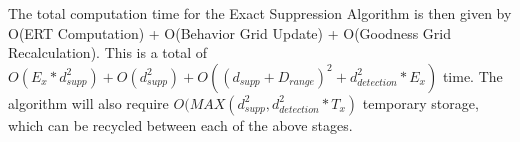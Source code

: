 The total computation time for the Exact Suppression Algorithm is then given by O(ERT Computation) + O(Behavior Grid Update) + O(Goodness Grid Recalculation). This is a total of $O(E_{x} * d_{supp}^2) + O(d_{supp}^2) + O((d_{supp} + D_{range})^2 + d_{detection}^2 * E_x)$ time.  The algorithm will also require $O(MAX(d_{supp}^2 , d_{detection}^2 * T_x)$ temporary storage, which can be recycled between each of the above stages.
